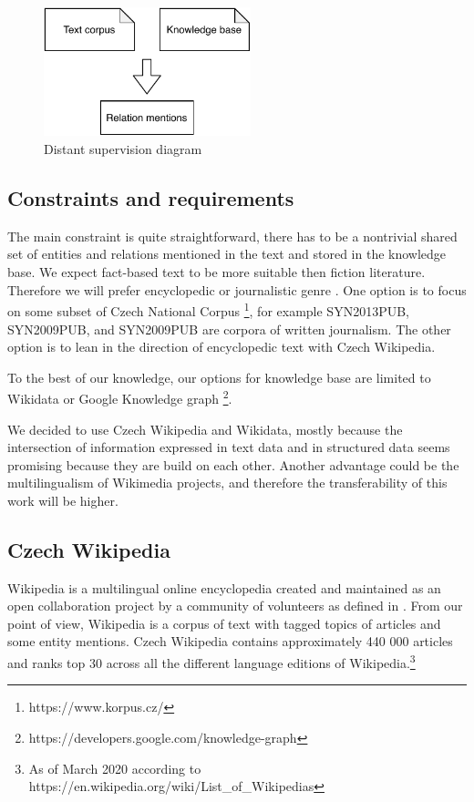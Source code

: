 \begin{figure}[h]\centering
\includegraphics[width=60mm]{./img//Diplomka diagramy-Distant supervision}
\caption{Distant supervision diagram}
\label{obr03:DSD}
\end{figure}

\subsection{Constraints and requirements}
The main constraint is quite straightforward, there has to be a nontrivial shared set of entities and relations mentioned in the text and stored in the knowledge base. We expect fact-based text to be more suitable then fiction literature. Therefore we will prefer encyclopedic or journalistic genre . One option is to focus on some subset of Czech National Corpus \footnote{https://www.korpus.cz/}, for example SYN2013PUB, SYN2009PUB, and SYN2009PUB are corpora of written journalism. The other option is to lean in the direction of encyclopedic text with Czech Wikipedia.

To the best of our knowledge, our options for knowledge base are limited to Wikidata or Google Knowledge graph \footnote{https://developers.google.com/knowledge-graph}.

We decided to use Czech Wikipedia and Wikidata, mostly because the intersection of information expressed in text data and in structured data seems promising because they are build on each other. Another advantage could be the multilingualism of Wikimedia projects, and therefore the transferability of this work will be higher. 


\subsection{Czech Wikipedia}

Wikipedia is a multilingual online encyclopedia created and maintained as an open collaboration project by a community of volunteers as defined in \cite{wiki:wiki}. From our point of view, Wikipedia is a corpus of text with tagged topics of articles and some entity mentions. Czech Wikipedia contains approximately 440 000 articles and ranks top 30 across all the different language editions of Wikipedia.\footnote{As of March 2020 according to https://en.wikipedia.org/wiki/List\_of\_Wikipedias}

